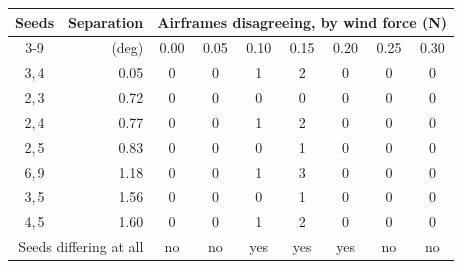 \begin{tabular}{crccccccc}
\toprule
Seeds & Separation & \multicolumn{7}{c}{Airframes disagreeing, by wind force (N)} \\
\cmidrule(lr){3-9}
 & (deg) & 0.00 & 0.05 & 0.10 & 0.15 & 0.20 & 0.25 & 0.30 \\
\midrule
3,\,4 & 0.05 & 0 & 0 & 1 & 2 & 0 & 0 & 0 \\
2,\,3 & 0.72 & 0 & 0 & 0 & 0 & 0 & 0 & 0 \\
2,\,4 & 0.77 & 0 & 0 & 1 & 2 & 0 & 0 & 0 \\
2,\,5 & 0.83 & 0 & 0 & 0 & 1 & 0 & 0 & 0 \\
6,\,9 & 1.18 & 0 & 0 & 1 & 3 & 0 & 0 & 0 \\
3,\,5 & 1.56 & 0 & 0 & 0 & 1 & 0 & 0 & 0 \\
4,\,5 & 1.60 & 0 & 0 & 1 & 2 & 0 & 0 & 0 \\
\midrule
\multicolumn{2}{r}{Seeds differing at all} & no & no & yes & yes & yes & no & no \\
\bottomrule
\end{tabular}
